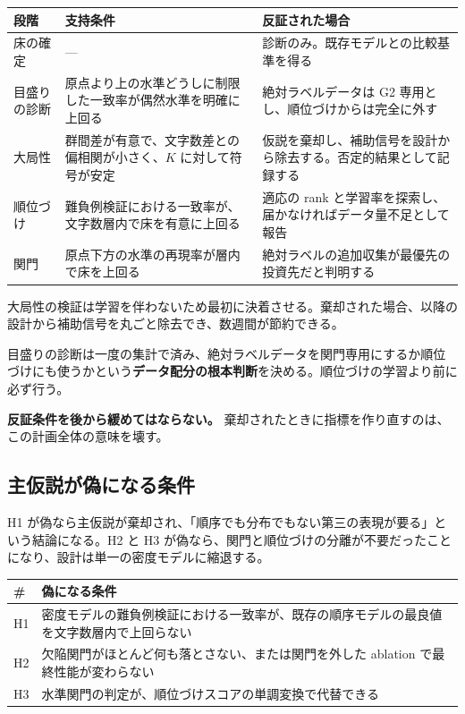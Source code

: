 \documentclass[a4paper,10.5pt]{ltjsarticle}
\begin{document}
\begin{center}
\begin{tabularx}{\textwidth}{@{}p{4.2em} p{12em} X@{}}
\toprule
\sffamily\bfseries 段階 & \sffamily\bfseries 支持条件 & \sffamily\bfseries 反証された場合 \\
\midrule
床の確定 & --- & 診断のみ。既存モデルとの比較基準を得る \\
目盛りの診断 & 原点より上の水準どうしに制限した一致率が偶然水準を明確に上回る & 絶対ラベルデータは G2 専用とし、順位づけからは完全に外す \\
大局性 & 群間差が有意で、文字数差との偏相関が小さく、$K$ に対して符号が安定 & 仮説を棄却し、補助信号を設計から除去する。否定的結果として記録する \\
順位づけ & 難負例検証における一致率が、文字数層内で床を有意に上回る & 適応の rank と学習率を探索し、届かなければデータ量不足として報告 \\
関門 & 原点下方の水準の再現率が層内で床を上回る & 絶対ラベルの追加収集が最優先の投資先だと判明する \\
\bottomrule
\end{tabularx}
\end{center}

\begin{keybox}[title=実行順序]
大局性の検証は学習を伴わないため最初に決着させる。棄却された場合、以降の設計から補助信号を丸ごと除去でき、数週間が節約できる。

目盛りの診断は一度の集計で済み、絶対ラベルデータを関門専用にするか順位づけにも使うかという\textbf{データ配分の根本判断}を決める。順位づけの学習より前に必ず行う。

\textbf{反証条件を後から緩めてはならない。} 棄却されたときに指標を作り直すのは、この計画全体の意味を壊す。
\end{keybox}

\subsection{主仮説が偽になる条件}

H1 が偽なら主仮説が棄却され、「順序でも分布でもない第三の表現が要る」という結論になる。H2 と H3 が偽なら、関門と順位づけの分離が不要だったことになり、設計は単一の密度モデルに縮退する。

\begin{center}
\begin{tabularx}{\textwidth}{@{}p{2.2em} X@{}}
\toprule
\sffamily\bfseries \# & \sffamily\bfseries 偽になる条件 \\
\midrule
H1 & 密度モデルの難負例検証における一致率が、既存の順序モデルの最良値を文字数層内で上回らない \\
H2 & 欠陥関門がほとんど何も落とさない、または関門を外した ablation で最終性能が変わらない \\
H3 & 水準関門の判定が、順位づけスコアの単調変換で代替できる \\
\bottomrule
\end{tabularx}
\end{center}
\end{document}
